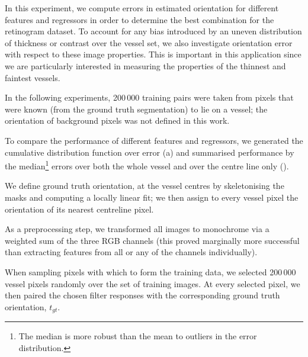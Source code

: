 In this experiment, we compute errors in estimated orientation for different features and regressors in order to determine the best combination for the retinogram dataset. To account for any bias introduced by an uneven distribution of thickness or contrast over the vessel set, we also investigate orientation error with respect to these image properties. This is important in this application since we are particularly interested in measuring the properties of the thinnest and faintest vessels.

In the following experiments, 200\,000 training pairs were taken from pixels that were known (from the ground truth segmentation) to lie on a vessel; the orientation of background pixels was not defined in this work.

To compare the performance of different features and regressors, we generated the cumulative distribution function over error (a) and summarised performance by the median\footnote{The median is more robust than the mean to outliers in the error distribution.} errors over both the whole vessel and over the centre line only ().

We define ground truth orientation, at the vessel centres by skeletonising the masks and computing a locally linear fit; we then assign to every vessel pixel the orientation of its nearest centreline pixel.

As a preprocessing step, we transformed all images to monochrome via a weighted sum of the three RGB channels (this proved marginally more successful than extracting features from all or any of the channels individually).


When sampling pixels with which to form the training data, we selected 200\,000 vessel pixels randomly over the set of training images. At every selected pixel, we then paired the chosen filter responses with the corresponding ground truth orientation, $t_{gt}$.






